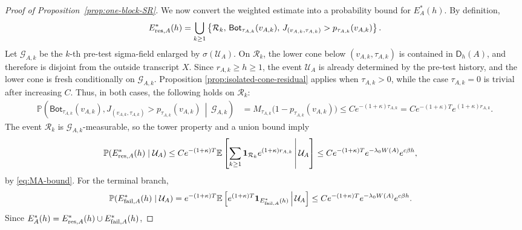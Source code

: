 \documentclass[letterpaper,11pt,reqno]{amsart}
\theoremstyle{definition}
\begin{document}
\begin{proof}[Proof of Proposition~\ref{prop:one-block-SR}]
We now convert the weighted estimate into a probability bound for
\(E_A^*(h)\). By definition,
\[
        E_{{\rm res},A}^*(h)
        =
        \bigcup_{k\ge1}
        \left\{
            \mathcal R_k,\,
            \mathsf{Bot}_{\tau_{A,k}}(v_{A,k}),\,
            J_{(v_{A,k},\tau_{A,k})}>p_{\tau_{A,k}}(v_{A,k})
        \right\}.
\]
Let \(\mathcal G_{A,k}\) be the \(k\)-th pre-test sigma-field enlarged
by \(\sigma(\mathcal U_A)\). On \(\mathcal R_k\), the lower cone below
\((v_{A,k},\tau_{A,k})\) is contained in \(\mathsf D_h(A)\), and
therefore is disjoint from the outside transcript \(X\). Since
\(r_{A,k}\ge h\ge1\), the event \(\mathcal U_A\) is already
determined by the pre-test history, and the lower cone is fresh conditionally
on \(\mathcal G_{A,k}\). Proposition \ref{prop:isolated-cone-residual}
applies when \(\tau_{A,k}>0\), while the case \(\tau_{A,k}=0\) is trivial after
increasing \(C\). Thus, in both cases, the following holds on \(\mathcal R_k\):
\[
\begin{aligned}
        \mathbb P
        \left(
            \mathsf{Bot}_{\tau_{A,k}}(v_{A,k}),
            J_{(v_{A,k},\tau_{A,k})}>p_{\tau_{A,k}}(v_{A,k})
            \,\middle|\,
            \mathcal G_{A,k}
        \right)
        &=
        M_{\tau_{A,k}}\bigl(1-p_{\tau_{A,k}}(v_{A,k})\bigr)
        \le
        C e^{-(1+\kappa)\tau_{A,k}}     
        =
        C e^{-(1+\kappa) T}e^{(1+\kappa)r_{A,k}} .
\end{aligned}
\]
The event \(\mathcal R_k\) is \(\mathcal G_{A,k}\)-measurable, so the
tower property and a union bound imply
\[
\begin{aligned}
        \mathbb P(E_{{\rm res},A}^*(h)\mid\mathcal U_A)
        &\le
        C e^{-(1+\kappa) T}
        \mathbb E
        \left[
            \sum_{k\ge1}
            \mathbf 1_{\mathcal R_k}
            e^{(1+\kappa)r_{A,k}}
            \,\middle|\,
            \mathcal U_A
        \right]
        \le
        C e^{-(1+\kappa) T}
        e^{-\lambda_0W(A)}e^{c\beta h},
\end{aligned}
\]
by \eqref{eq:MA-bound}.
For the terminal branch,
\[
\begin{aligned}
        \mathbb P(E_{{\rm fail},A}^*(h)\mid\mathcal U_A)
        &=
        e^{-(1+\kappa) T}
        \mathbb E
        \left[
            e^{(1+\kappa) T}
            \mathbf 1_{E_{{\rm fail},A}^*(h)}
            \,\middle|\,
            \mathcal U_A
        \right]  \le
        C e^{-(1+\kappa) T}
        e^{-\lambda_0W(A)}e^{c\beta h}.
\end{aligned}
\]
Since \(E_A^*(h)=E_{{\rm res},A}^*(h)\cup E_{{\rm fail},A}^*(h)\),

\end{proof}
\end{document}

